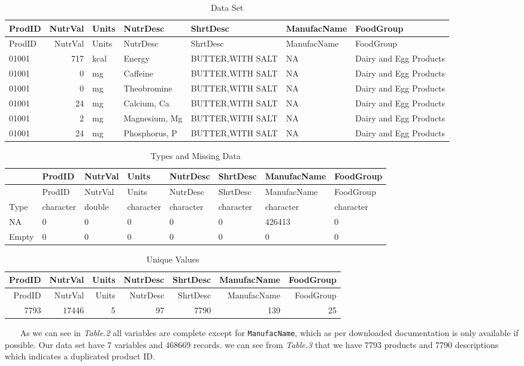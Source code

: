\documentclass[]{article}
\begin{document}
\begin{longtable}[]{@{}lrlllll@{}}
\caption{Data Set}\tabularnewline
\toprule
ProdID & NutrVal & Units & NutrDesc & ShrtDesc & ManufacName &
FoodGroup\tabularnewline
\midrule
\endfirsthead
\toprule
ProdID & NutrVal & Units & NutrDesc & ShrtDesc & ManufacName &
FoodGroup\tabularnewline
\midrule
\endhead
01001 & 717 & kcal & Energy & BUTTER,WITH SALT & NA & Dairy and Egg
Products\tabularnewline
01001 & 0 & mg & Caffeine & BUTTER,WITH SALT & NA & Dairy and Egg
Products\tabularnewline
01001 & 0 & mg & Theobromine & BUTTER,WITH SALT & NA & Dairy and Egg
Products\tabularnewline
01001 & 24 & mg & Calcium, Ca & BUTTER,WITH SALT & NA & Dairy and Egg
Products\tabularnewline
01001 & 2 & mg & Magnesium, Mg & BUTTER,WITH SALT & NA & Dairy and Egg
Products\tabularnewline
01001 & 24 & mg & Phosphorus, P & BUTTER,WITH SALT & NA & Dairy and Egg
Products\tabularnewline
\bottomrule
\end{longtable}

\begin{longtable}[]{@{}llllllll@{}}
\caption{Types and Missing Data}\tabularnewline
\toprule
& ProdID & NutrVal & Units & NutrDesc & ShrtDesc & ManufacName &
FoodGroup\tabularnewline
\midrule
\endfirsthead
\toprule
& ProdID & NutrVal & Units & NutrDesc & ShrtDesc & ManufacName &
FoodGroup\tabularnewline
\midrule
\endhead
Type & character & double & character & character & character &
character & character\tabularnewline
NA & 0 & 0 & 0 & 0 & 0 & 426413 & 0\tabularnewline
Empty & 0 & 0 & 0 & 0 & 0 & 0 & 0\tabularnewline
\bottomrule
\end{longtable}

\begin{longtable}[]{@{}rrrrrrr@{}}
\caption{Unique Values}\tabularnewline
\toprule
ProdID & NutrVal & Units & NutrDesc & ShrtDesc & ManufacName &
FoodGroup\tabularnewline
\midrule
\endfirsthead
\toprule
ProdID & NutrVal & Units & NutrDesc & ShrtDesc & ManufacName &
FoodGroup\tabularnewline
\midrule
\endhead
7793 & 17446 & 5 & 97 & 7790 & 139 & 25\tabularnewline
\bottomrule
\end{longtable}

~~~ As we can see in \emph{Table.2} all variables are complete except
for \texttt{ManufacName}, which as per downloaded documentation is only
available if possible. Our data set have 7 variables and 468669 records.
we can see from \emph{Table.3} that we have 7793 products and 7790
descriptions which indicates a duplicated product ID.

\newpage
\end{document}
